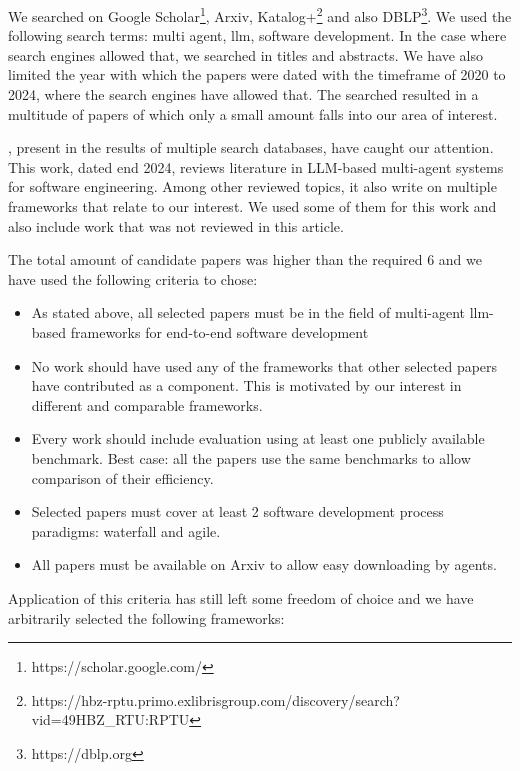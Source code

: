 We searched on Google Scholar\footnote{https://scholar.google.com/}, Arxiv, Katalog+\footnote{https://hbz-rptu.primo.exlibrisgroup.com/discovery/search?vid=49HBZ\_RTU:RPTU} and also DBLP\footnote{https://dblp.org}. We used the following search terms: multi agent, llm, software development. In the case where search engines allowed that, we searched in titles and abstracts. We have also limited the year with which the papers were dated with the timeframe of 2020 to 2024, where the search engines have allowed that. The searched resulted in a multitude of papers of which only a small amount falls into our area of interest. 

\cite{he2024llm}, present in the results of multiple search databases, have caught our attention. This work, dated end 2024, reviews literature in LLM-based multi-agent systems for software engineering. Among other reviewed topics, it also write on multiple frameworks that relate to our interest. We used some of them for this work and also include work that was not reviewed in this article.


The total amount of candidate papers was higher than the required 6 and we have used the following criteria to chose:

\begin{itemize}
	
	\item As stated above, all selected papers must be in the field of multi-agent llm-based frameworks for end-to-end software development 	 
	\item No work should have used any of the frameworks that other selected papers have contributed as a component. This is motivated by our interest in different and comparable frameworks.
	\item Every work should include evaluation using at least one publicly available benchmark. Best case: all the papers use the same benchmarks to allow comparison of their efficiency.
	\item Selected papers must cover at least 2 software development process paradigms: waterfall and agile.
	\item All papers must be available on Arxiv to allow easy downloading by agents.
\end{itemize}

Application of this criteria has still left some freedom of choice and we have arbitrarily selected the following frameworks:


